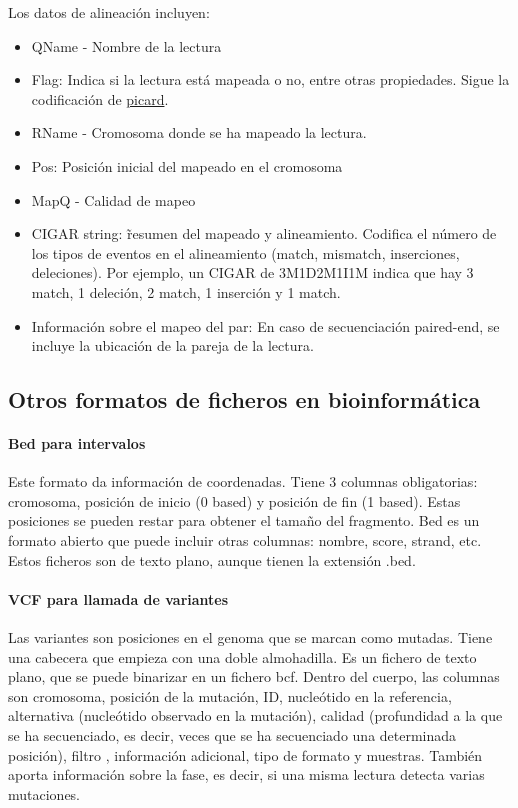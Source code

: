 Los datos de alineación incluyen: 
\begin{itemize} 
\item QName - Nombre de la lectura 
\item Flag: Indica si la lectura está mapeada o no, entre otras propiedades. Sigue la codificación de \href{https://broadinstitute.github.io/picard/explain-flags.html}{picard}.
\item RName - Cromosoma donde se ha mapeado la lectura. 
\item Pos: Posición inicial del mapeado en el cromosoma 
\item MapQ - Calidad de mapeo 
\item CIGAR string: \~ resumen del mapeado y alineamiento. Codifica el número de los tipos de eventos en el alineamiento (match, mismatch, inserciones, deleciones). Por ejemplo, un CIGAR de 3M1D2M1I1M indica que hay 3 match, 1 deleción, 2 match, 1 inserción y 1 match.
\item Información sobre el mapeo del par: En caso de secuenciación paired-end, se incluye la ubicación de la pareja de la lectura. 
\end{itemize}

\subsection{Otros formatos de ficheros en bioinformática}
\paragraph{Bed para intervalos}
Este formato da información de coordenadas. Tiene 3 columnas obligatorias: cromosoma, posición de inicio (0 based) y posición de fin (1 based). Estas posiciones se pueden restar para obtener el tamaño del fragmento. Bed es un formato abierto que puede incluir otras columnas: nombre, score, strand, etc. Estos ficheros son de texto plano, aunque tienen la extensión .bed. 

\paragraph{VCF para llamada de variantes}
Las variantes son posiciones en el genoma que se marcan como mutadas. Tiene una cabecera que empieza con una doble almohadilla. Es un fichero de texto plano, que se puede binarizar en un fichero bcf. Dentro del cuerpo, las columnas son cromosoma, posición de la mutación, ID, nucleótido en la referencia, alternativa (nucleótido observado en la mutación), calidad (profundidad a la que se ha secuenciado, es decir, veces que se ha secuenciado una determinada posición), filtro , información adicional, tipo de formato y muestras. También aporta información sobre la fase, es decir, si una misma lectura detecta varias mutaciones.

